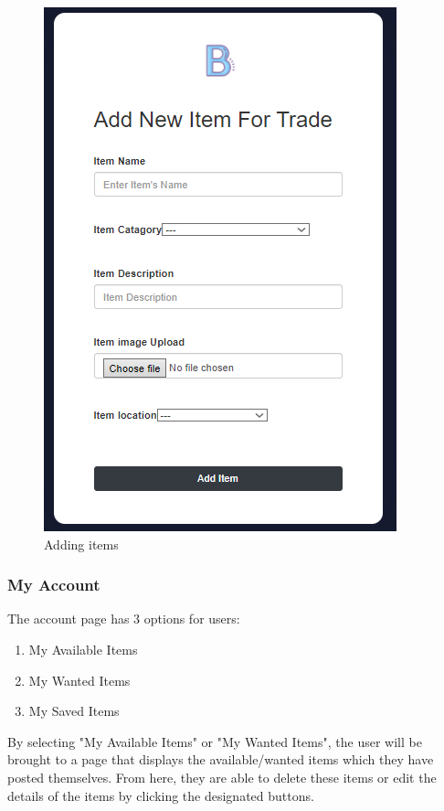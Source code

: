 \begin{figure}[h]
\renewcommand\thefigure{4.5}
\centering
\includegraphics[scale=.6]{img/fe_additem.PNG}
\caption{Adding items}
\label{AddItem}
\end{figure}

\subsubsection{My Account}
The account page has 3 options for users:
\begin{enumerate}
  \item My Available Items
  \item My Wanted Items
  \item My Saved Items
\end{enumerate}
By selecting "My Available Items" or "My Wanted Items", the user will be brought to a page that displays the available/wanted items which they have posted themselves. From here, they are able to delete these items or edit the details of the items by clicking the designated buttons.

